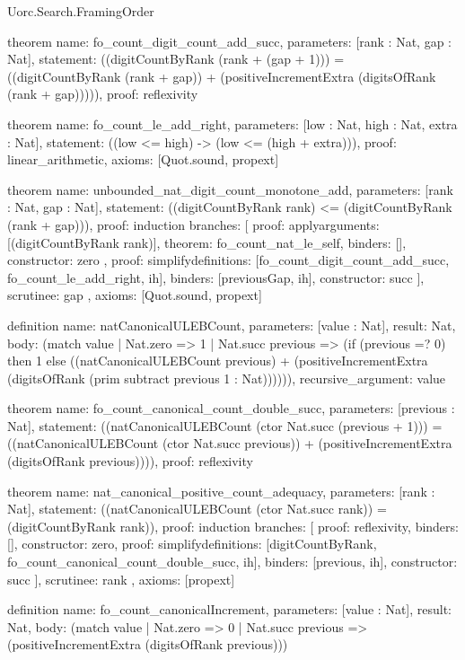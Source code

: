 \begin{lexlean}{Uorc.Search.FramingOrder}
\begin{semanticmodule}
theorem{
  name: fo_count_digit_count_add_succ,
  parameters: [rank : Nat, gap : Nat],
  statement: ((digitCountByRank (rank + (gap + 1))) = ((digitCountByRank (rank + gap)) + (positiveIncrementExtra (digitsOfRank (rank + gap))))),
  proof: reflexivity{}
}

theorem{
  name: fo_count_le_add_right,
  parameters: [low : Nat, high : Nat, extra : Nat],
  statement: ((low <= high) -> (low <= (high + extra))),
  proof: linear_arithmetic{},
  axioms: [Quot.sound, propext]
}

theorem{
  name: unbounded_nat_digit_count_monotone_add,
  parameters: [rank : Nat, gap : Nat],
  statement: ((digitCountByRank rank) <= (digitCountByRank (rank + gap))),
  proof: induction{
    branches: [
      {
        proof: apply{arguments: [(digitCountByRank rank)], theorem: fo_count_nat_le_self},
        binders: [],
        constructor: zero
      },
      {
        proof: simplify{definitions: [fo_count_digit_count_add_succ, fo_count_le_add_right, ih]},
        binders: [previousGap, ih],
        constructor: succ
      }
    ],
    scrutinee: gap
  },
  axioms: [Quot.sound, propext]
}

definition{
  name: natCanonicalULEBCount,
  parameters: [value : Nat],
  result: Nat,
  body: (match value
    | Nat.zero => 1
    | Nat.succ previous => (if (previous =? 0) then 1 else ((natCanonicalULEBCount previous) + (positiveIncrementExtra (digitsOfRank (prim subtract previous 1 : Nat)))))),
  recursive_argument: value
}

theorem{
  name: fo_count_canonical_count_double_succ,
  parameters: [previous : Nat],
  statement: ((natCanonicalULEBCount (ctor Nat.succ (previous + 1))) = ((natCanonicalULEBCount (ctor Nat.succ previous)) + (positiveIncrementExtra (digitsOfRank previous)))),
  proof: reflexivity{}
}

theorem{
  name: nat_canonical_positive_count_adequacy,
  parameters: [rank : Nat],
  statement: ((natCanonicalULEBCount (ctor Nat.succ rank)) = (digitCountByRank rank)),
  proof: induction{
    branches: [
      {proof: reflexivity{}, binders: [], constructor: zero},
      {
        proof: simplify{definitions: [digitCountByRank, fo_count_canonical_count_double_succ, ih]},
        binders: [previous, ih],
        constructor: succ
      }
    ],
    scrutinee: rank
  },
  axioms: [propext]
}

definition{
  name: fo_count_canonicalIncrement,
  parameters: [value : Nat],
  result: Nat,
  body: (match value
    | Nat.zero => 0
    | Nat.succ previous => (positiveIncrementExtra (digitsOfRank previous)))
}


\end{semanticmodule}
\end{lexlean}
